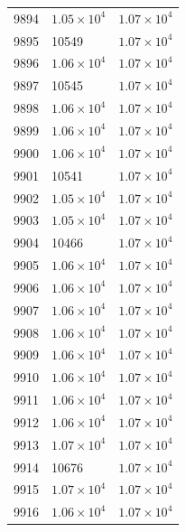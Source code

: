 \begin{table}[H]
\begin{tabular}{lll}
9894 & $\displaystyle 1.05 \times 10^{4}$ & $\displaystyle 1.07 \times 10^{4}$ \\
9895 & 10549 & $\displaystyle 1.07 \times 10^{4}$ \\
9896 & $\displaystyle 1.06 \times 10^{4}$ & $\displaystyle 1.07 \times 10^{4}$ \\
9897 & 10545 & $\displaystyle 1.07 \times 10^{4}$ \\
9898 & $\displaystyle 1.06 \times 10^{4}$ & $\displaystyle 1.07 \times 10^{4}$ \\
9899 & $\displaystyle 1.06 \times 10^{4}$ & $\displaystyle 1.07 \times 10^{4}$ \\
9900 & $\displaystyle 1.06 \times 10^{4}$ & $\displaystyle 1.07 \times 10^{4}$ \\
9901 & 10541 & $\displaystyle 1.07 \times 10^{4}$ \\
9902 & $\displaystyle 1.05 \times 10^{4}$ & $\displaystyle 1.07 \times 10^{4}$ \\
9903 & $\displaystyle 1.05 \times 10^{4}$ & $\displaystyle 1.07 \times 10^{4}$ \\
9904 & 10466 & $\displaystyle 1.07 \times 10^{4}$ \\
9905 & $\displaystyle 1.06 \times 10^{4}$ & $\displaystyle 1.07 \times 10^{4}$ \\
9906 & $\displaystyle 1.06 \times 10^{4}$ & $\displaystyle 1.07 \times 10^{4}$ \\
9907 & $\displaystyle 1.06 \times 10^{4}$ & $\displaystyle 1.07 \times 10^{4}$ \\
9908 & $\displaystyle 1.06 \times 10^{4}$ & $\displaystyle 1.07 \times 10^{4}$ \\
9909 & $\displaystyle 1.06 \times 10^{4}$ & $\displaystyle 1.07 \times 10^{4}$ \\
9910 & $\displaystyle 1.06 \times 10^{4}$ & $\displaystyle 1.07 \times 10^{4}$ \\
9911 & $\displaystyle 1.06 \times 10^{4}$ & $\displaystyle 1.07 \times 10^{4}$ \\
9912 & $\displaystyle 1.06 \times 10^{4}$ & $\displaystyle 1.07 \times 10^{4}$ \\
9913 & $\displaystyle 1.07 \times 10^{4}$ & $\displaystyle 1.07 \times 10^{4}$ \\
9914 & 10676 & $\displaystyle 1.07 \times 10^{4}$ \\
9915 & $\displaystyle 1.07 \times 10^{4}$ & $\displaystyle 1.07 \times 10^{4}$ \\
9916 & $\displaystyle 1.06 \times 10^{4}$ & $\displaystyle 1.07 \times 10^{4}$ \\

\end{tabular}
\end{table}
